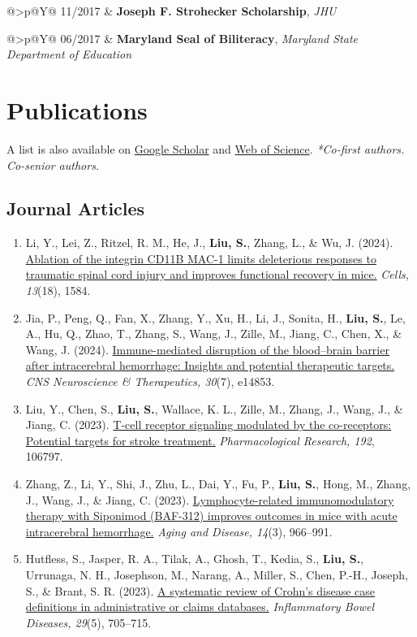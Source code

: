 \documentclass[10pt,letterpaper]{article}
\makeatletter
\newlength{\datewidth}
\newcommand{\cventry}[2]{%
  \Needspace{2\baselineskip}%
  \begin{tabularx}{\textwidth}{@{}>{\raggedleft\arraybackslash\small}p{\datewidth}@{\hspace{0.16in}}Y@{}}%
    #1 & #2%
  \end{tabularx}\par\vspace{0.12em}%
}
\newcommand{\cvsection}[1]{%
  \Needspace{7\baselineskip}%
  \section*{#1}%
}
\newcommand{\cvsubsection}[1]{%
  \Needspace{4\baselineskip}%
  \subsection*{#1}%
}
\newcommand{\publication}[2][]{%
  \Needspace{2\baselineskip}%
  \item[#1] {\interlinepenalty=10000 #2\par}%
}
\makeatother
\begin{document}
\cventry{11/2017}{\textbf{Joseph F. Strohecker Scholarship}, \emph{JHU}}

\cventry{06/2017}{\textbf{Maryland Seal of Biliteracy}, \emph{Maryland State Department of Education}}


\cvsection{Publications}

A list is also available on \href{https://scholar.google.com/citations?user=fwh\_UDMAAAAJ\&hl=en}{Google Scholar} and \href{https://www.webofscience.com/wos/author/record/2514221}{Web of Science}.
\emph{*Co-first authors. \ddag{}Co-senior authors.}

\cvsubsection{Journal Articles}

\begin{enumerate}[leftmargin=2.7em,labelsep=0.6em]

\publication[J-12]{Li, Y., Lei, Z., Ritzel, R. M., He, J., \textbf{Liu, S.}, Zhang, L., \& Wu, J. (2024). \href{https://doi.org/10.3390/cells13181584}{Ablation of the integrin CD11B MAC-1 limits deleterious responses to traumatic spinal cord injury and improves functional recovery in mice.} \emph{Cells, 13}(18), 1584.}
\publication[J-11]{Jia, P., Peng, Q., Fan, X., Zhang, Y., Xu, H., Li, J., Sonita, H., \textbf{Liu, S.}, Le, A., Hu, Q., Zhao, T., Zhang, S., Wang, J., Zille, M., Jiang, C., Chen, X., \& Wang, J. (2024). \href{https://doi.org/10.1111/cns.14853}{Immune-mediated disruption of the blood--brain barrier after intracerebral hemorrhage: Insights and potential therapeutic targets.} \emph{CNS Neuroscience \& Therapeutics, 30}(7), e14853.}
\publication[J-10]{Liu, Y., Chen, S., \textbf{Liu, S.}, Wallace, K. L., Zille, M., Zhang, J., Wang, J., \& Jiang, C. (2023). \href{https://doi.org/10.1016/j.phrs.2023.106797}{T-cell receptor signaling modulated by the co-receptors: Potential targets for stroke treatment.} \emph{Pharmacological Research, 192}, 106797.}
\publication[J-9]{Zhang, Z., Li, Y., Shi, J., Zhu, L., Dai, Y., Fu, P., \textbf{Liu, S.}, Hong, M., Zhang, J., Wang, J., \& Jiang, C. (2023). \href{https://doi.org/10.14336/ad.2022.1102}{Lymphocyte-related immunomodulatory therapy with Siponimod (BAF-312) improves outcomes in mice with acute intracerebral hemorrhage.} \emph{Aging and Disease, 14}(3), 966--991.}
\publication[J-8]{Hutfless, S., Jasper, R. A., Tilak, A., Ghosh, T., Kedia, S., \textbf{Liu, S.}, Urrunaga, N. H., Josephson, M., Narang, A., Miller, S., Chen, P.-H., Joseph, S., \& Brant, S. R. (2023). \href{https://doi.org/10.1093/ibd/izac131}{A systematic review of Crohn's disease case definitions in administrative or claims databases.} \emph{Inflammatory Bowel Diseases, 29}(5), 705--715.}

\end{enumerate}
\end{document}
